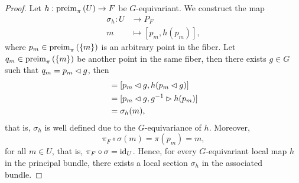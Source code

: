 \begin{proof}
    Let \(h : \operatorname{preim}_{\pi}{\left(U\right)} \to F\) be \(G\)-equivariant. We construct the map
    \begin{align*}
        \sigma_h : U &\to P_F\\
                      m &\mapsto [p_m, h(p_m)],
    \end{align*}
    where \(p_m \in \operatorname{preim}_{\pi}{\left(\{m\}\right)}\) is an arbitrary point in the fiber. Let \(q_m \in \operatorname{preim}_{\pi}{\left(\{m\}\right)}\) be another point in the same fiber, then there exists \(g \in G\) such that \(q_m = p_m \mathbin{\vartriangleleft} g\), then
    \begin{align*}
        [q_m, h(q_m)] &= [p_m \ract g, h(p_m \ract g)]\\
                         &= [p_m \ract g, g^{-1} \lact h(p_m)]\\
                         &= \sigma_h(m),
    \end{align*}
    that is, \(\sigma_h\) is well defined due to the \(G\)-equivariance of \(h\). Moreover,
    \begin{equation*}
        \pi_F \circ \sigma (m) = \pi(p_m) = m,
    \end{equation*}
    for all \(m \in U\), that is, \(\pi_F \circ \sigma = \operatorname{id}_{U}\). Hence, for every \(G\)-equivariant local map \(h\) in the principal bundle, there exists a local section \(\sigma_h\) in the associated bundle.


\end{proof}
